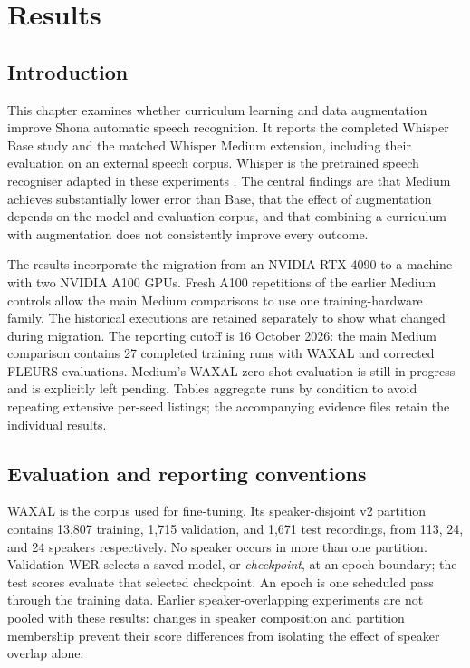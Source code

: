 \documentclass[12pt,a4paper]{report}
\begin{document}
\setcounter{chapter}{3}
\chapter{Results}
\label{chap:results}

\section{Introduction}

This chapter examines whether curriculum learning and data augmentation improve
Shona automatic speech recognition. It reports the completed Whisper Base study
and the matched Whisper Medium extension, including their evaluation on an
external speech corpus. Whisper is the pretrained speech recogniser adapted
in these experiments \citep{Radford2023}. The central findings are that Medium
achieves substantially lower error than Base, that the effect of augmentation
depends on the model and evaluation corpus, and that combining a curriculum
with augmentation does not consistently improve every outcome.

The results incorporate the migration from an NVIDIA RTX 4090 to a machine
with two NVIDIA A100 GPUs. Fresh A100 repetitions of the earlier Medium
controls allow the main Medium comparisons to use one training-hardware family.
The historical executions are retained separately to show what changed during
migration. The reporting cutoff is 16 October 2026: the main Medium comparison
contains 27 completed training runs with WAXAL and corrected FLEURS evaluations.
Medium's WAXAL zero-shot evaluation is still in progress and is explicitly
left pending. Tables aggregate runs by condition to avoid repeating extensive
per-seed listings; the accompanying evidence files retain the individual results.

\section{Evaluation and reporting conventions}

WAXAL is the corpus used for fine-tuning. Its speaker-disjoint v2 partition
contains 13,807 training, 1,715 validation, and 1,671 test recordings, from
113, 24, and 24 speakers respectively. No speaker occurs in more than one
partition. Validation WER selects a saved model, or \emph{checkpoint}, at an
epoch boundary; the test scores evaluate that selected checkpoint. An epoch
is one scheduled pass through the training data. Earlier speaker-overlapping
experiments are not pooled with these results: changes in speaker composition
and partition membership prevent their score differences from isolating the
effect of speaker overlap alone.
\end{document}
